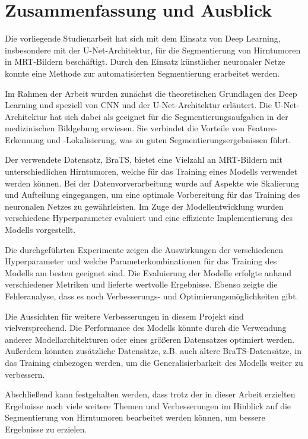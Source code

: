 \chapter{Zusammenfassung und Ausblick}
Die vorliegende Studienarbeit hat sich mit dem Einsatz von Deep Learning, insbesondere mit der U-Net-Architektur, für die Segmentierung von Hirntumoren in MRT-Bildern beschäftigt. Durch den Einsatz künstlicher neuronaler Netze konnte eine Methode zur automatisierten Segmentierung erarbeitet werden.

Im Rahmen der Arbeit wurden zunächst die theoretischen Grundlagen des Deep Learning und speziell von \ac{CNN} und der U-Net-Architektur erläutert. Die U-Net-Architektur hat sich dabei als geeignet für die Segmentierungsaufgaben in der medizinischen Bildgebung erwiesen. Sie verbindet die Vorteile von Feature-Erkennung und -Lokalisierung, was zu guten Segmentierungsergebnissen führt.

Der verwendete Datensatz, \ac{BraTS}, bietet eine Vielzahl an \ac{MRT}-Bildern mit unterschiedlichen Hirntumoren, welche für das Training eines \gls{Modell}s verwendet werden können. Bei der Datenvorverarbeitung wurde auf Aspekte wie Skalierung und Aufteilung eingegangen, um eine optimale Vorbereitung für das Training des neuronalen Netzes zu gewährleisten. Im Zuge der Modellentwicklung wurden verschiedene Hyperparameter evaluiert und eine effiziente Implementierung des Modells vorgestellt.

Die durchgeführten Experimente zeigen die Auswirkungen der verschiedenen Hyperparameter und welche Parameterkombinationen für das Training des Modells am besten geeignet sind. Die Evaluierung der Modelle erfolgte anhand verschiedener Metriken und lieferte wertvolle Ergebnisse. Ebenso zeigte die Fehleranalyse, dass es noch Verbesserungs- und Optimierungsmöglichkeiten gibt.

Die Aussichten für weitere Verbesserungen in diesem Projekt sind vielversprechend. Die Performance des Modells könnte durch die Verwendung anderer Modellarchitekturen oder eines größeren Datensatzes optimiert werden. Außerdem könnten zusätzliche Datensätze, z.B. auch ältere \ac{BraTS}-Datensätze, in das Training einbezogen werden, um die Generalisierbarkeit des Modells weiter zu verbessern. 

Abschließend kann festgehalten werden, dass trotz der in dieser Arbeit erzielten Ergebnisse noch viele weitere Themen und Verbesserungen im Hinblick auf die Segmentierung von Hirntumoren bearbeitet werden können, um bessere Ergebnisse zu erzielen.